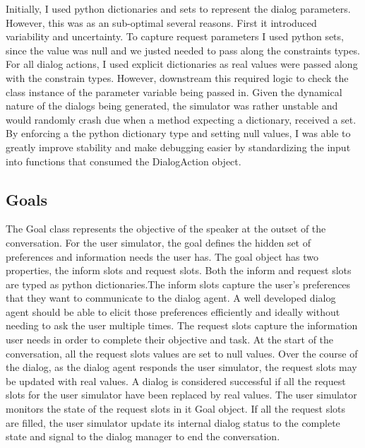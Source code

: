 Initially, I used python dictionaries and sets to represent the dialog parameters. However, this was as an sub-optimal several reasons. First it introduced variability and uncertainty. To capture request parameters I used python sets, since the value was null and we justed needed to pass along the constraints types. For all dialog actions, I used explicit dictionaries as real values were passed along with the constrain types. However, downstream this required logic to check the class instance of the parameter variable being passed in. Given the dynamical nature of the dialogs being generated, the simulator was rather unstable and would randomly crash due when a method expecting a dictionary, received a set. By enforcing a the python dictionary type and setting null values, I was able to greatly improve stability and make debugging easier by standardizing the input into functions that consumed the DialogAction object. 

\subsection{Goals}

The Goal class represents the objective of the speaker at the outset of the conversation. For the user simulator, the goal defines the hidden set of preferences and information needs the user has. The goal object has two properties, the inform slots and request slots. Both the inform and request slots are typed as python dictionaries.The inform slots capture the user's preferences that they want to communicate to the dialog agent. A well developed dialog agent should be able to elicit those preferences efficiently and ideally without needing to ask the user multiple times. The request slots capture the information user needs in order to complete their objective and task. At the start of the conversation, all the request slots values are set to null values. Over the course of the dialog, as the dialog agent responds the user simulator, the request slots may be updated with real values. A dialog is considered successful if all the request slots for the user simulator have been replaced by real values. The user simulator monitors the state of the request slots in it Goal object. If all the request slots are filled, the user simulator update its internal dialog status to the complete state and signal to the dialog manager to end the conversation. 

